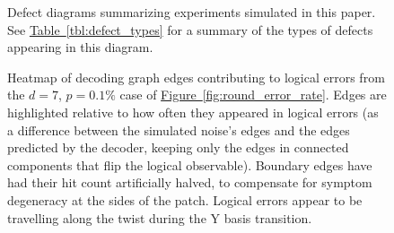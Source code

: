 \documentclass[onecolumn,unpublished,a4paper]{quantumarticle}
\theoremstyle{definition}
\theoremstyle{definition}
\theoremstyle{definition}
\newcommand{\fig}[1]{\hyperref[fig:#1]{Figure~\ref*{fig:#1}}}
\newcommand{\tbl}[1]{\hyperref[tbl:#1]{Table~\ref*{tbl:#1}}}
\begin{document}
\begin{figure}
    \centering
    \caption{
        Defect diagrams summarizing experiments simulated in this paper.
        See \tbl{defect_types} for a summary of the types of defects appearing in this diagram.
    }
    \label{fig:experiment_defect_diagrams}
\end{figure}

\begin{figure}
    \centering
    \caption{
        Heatmap of decoding graph edges contributing to logical errors from the $d=7$, $p=0.1\%$ case of \fig{round_error_rate}.
        Edges are highlighted relative to how often they appeared in logical errors (as a difference between the simulated noise's edges and the edges predicted by the decoder, keeping only the edges in connected components that flip the logical observable).
        Boundary edges have had their hit count artificially halved, to compensate for symptom degeneracy at the sides of the patch.
        Logical errors appear to be travelling along the twist during the Y basis transition.
    }
    \label{fig:error_heat}
\end{figure}
\end{document}

